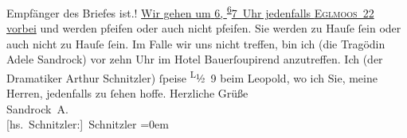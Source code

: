 \begin{ledgroupsized}[t]{13cm}
{{{                     Empfänger des Briefes ist.}}}\label{K_L00364-1h}!\pend\pstart
           \uline{Wir gehen um{ }}\uline{6}\uline{,{ }}\substVorne{}\textsuperscript{\uline{6}}\substDazwischen{}\uline{7}\substHinten{}\uline{ Uhr}\uline{ jedenfalls \textsc{Eglmoos 22} vorbei} und werden pfeifen oder auch nicht pfeifen. Sie werden zu Hauſe
               ſein oder auch nicht zu Hauſe ſein. Im Falle wir uns nicht {\pb}treffen, bin ich (die Tragödin Adele Sandrock) vor
               zehn Uhr im Hotel Bauerſoupirend anzutreffen. Ich (der Dramatiker Arthur
               Schnitzler) ſpeise \substVorne{}\textsuperscript{L}\substDazwischen{}½ 9\substHinten{} beim Leopold, wo ich Sie, meine Herren,
               jedenfalls zu ſehen hoffe.\pend
           \pstart
           Herzliche Grüße{\\[\baselineskip]}\spacefill\mbox{Sandrock A.}{\\[\baselineskip]}\spacefill\mbox{{[}hs. Schnitzler:{]} Schnitzler}\pend
           \leftskip=0em{}
         
         \endnumbering{}\end{ledgroupsized}  \newcommand{\dateiname}{L00364}\newcommand{\titel}{Adele Sandrock und Arthur Schnitzler an Richard Beer-Hofmann und Paul Goldmann, 29. 8. 1894}\newcommand{\editorInnen}{Martin Anton Müller und Gerd-Hermann Susen}
      
